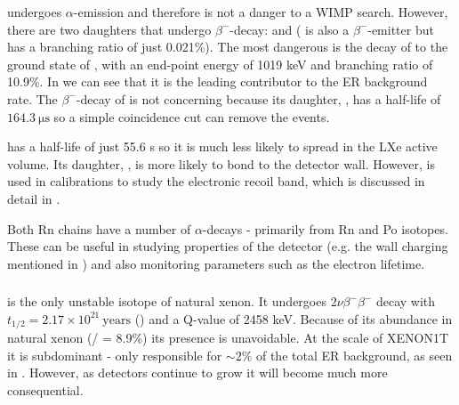  undergoes $\alpha$-emission and therefore is not a danger to a WIMP search.  However, there are two daughters that undergo
$\beta^-$-decay:  and  ( is also a $\beta^-$-emitter but has a branching ratio of just
0.021\%).  The most dangerous is the decay of  to the ground state of , with an end-point energy of 1019 keV and
branching ratio of 10.9\%.  In  we can see that it is the leading contributor to the ER
background rate.  The $\beta^-$-decay of  is not concerning because its daughter, , has a half-life of
$164.3\ \mathrm{\mu s}$ so a simple coincidence cut can remove the events.

 has a half-life of just 55.6 s so it is much less likely to spread in the LXe active volume.  Its daughter, ,
is more likely to bond to the detector wall.  However,  is used in calibrations to study the electronic recoil band, which is
discussed in detail in \secref{}.

Both Rn chains have a number of $\alpha$-decays - primarily from Rn and Po isotopes.  These can be useful in studying properties of the
detector (e.g. the wall charging mentioned in ) and also monitoring parameters such as
the electron lifetime.

\begin{figure}
\centering
{}
\label{fig:backgrounds_er_spectrum}
\end{figure}

\begin{figure}
\centering
{}
\label{fig:backgrounds_er_spectrum_zoomed}
\end{figure}



\subsubsection{}
\label{subsubsec:backgrounds_electronic_xe}
 is the only unstable isotope of natural xenon.  It undergoes $2 \nu \beta^- \beta^-$ decay with
$t_{1/2} = 2.17 \times 10^{21}\ \mathrm{years}$ () and a Q-value of 2458 keV.  Because of its abundance in natural
xenon (/ = 8.9\%) its presence is unavoidable.  At the scale of XENON1T it is subdominant - only responsible for
${\sim}2 \%$ of the total ER background, as seen in .  However, as detectors continue to grow
it will become much more consequential.



